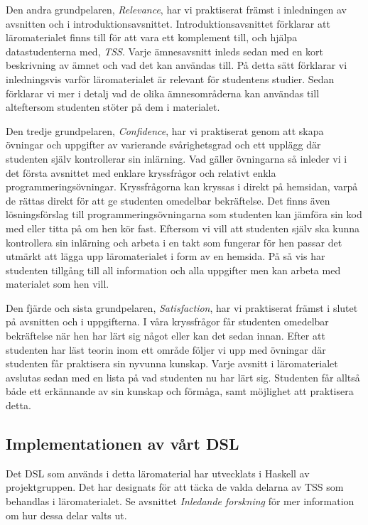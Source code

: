 \documentclass[]{article}
\begin{document}
Den andra grundpelaren, \textit{Relevance}, har vi praktiserat främst i inledningen av avsnitten och i
introduktionsavsnittet. Introduktionsavsnittet förklarar att läromaterialet finns till för att vara ett
komplement till, och hjälpa datastudenterna med, \textit{TSS}. Varje ämnesavsnitt inleds sedan med en kort
beskrivning av ämnet och vad det kan användas till. På detta sätt förklarar vi inledningsvis varför
läromaterialet är relevant för studentens studier. Sedan förklarar vi mer i detalj vad de olika
ämnesområderna kan användas till alteftersom studenten stöter på dem i materialet.

Den tredje grundpelaren, \textit{Confidence}, har vi praktiserat genom att skapa övningar och uppgifter
av varierande svårighetsgrad och ett upplägg där studenten själv kontrollerar sin inlärning. Vad gäller
övningarna så inleder vi i det första avsnittet med enklare kryssfrågor och relativt enkla
programmeringsövningar. Kryssfrågorna kan kryssas i direkt på hemsidan, varpå de rättas direkt för att
ge studenten omedelbar bekräftelse. Det finns även lösningsförslag till programmeringsövningarna som
studenten kan jämföra sin kod med eller titta på om hen kör fast. Eftersom vi vill att studenten själv
ska kunna kontrollera sin inlärning och arbeta i en takt som fungerar för hen passar det utmärkt att
lägga upp läromaterialet i form av en hemsida. På så vis har studenten tillgång till all information och
alla uppgifter men kan arbeta med materialet som hen vill.

Den fjärde och sista grundpelaren, \textit{Satisfaction}, har vi praktiserat främst i slutet på
avsnitten och i uppgifterna. I våra kryssfrågor får studenten omedelbar bekräftelse när hen har lärt sig
något eller kan det sedan innan. Efter att studenten har läst teorin inom ett område följer vi upp med
övningar där studenten får praktisera sin nyvunna kunskap. Varje avsnitt i läromaterialet avslutas sedan
med en lista på vad studenten nu har lärt sig. Studenten får alltså både ett erkännande av sin kunskap
och förmåga, samt möjlighet att praktisera detta.

\subsection{Implementationen av vårt DSL}
Det DSL som används i detta läromaterial har utvecklats i Haskell av projektgruppen. Det har designats för att täcka de
valda delarna av TSS som behandlas i läromaterialet. Se avsnittet \textit{Inledande forskning} för mer information om
hur dessa delar valts ut.
\end{document}
